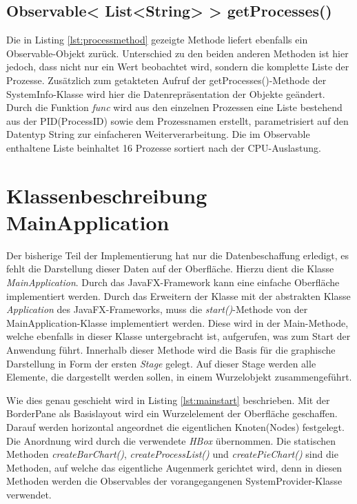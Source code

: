 \subsection{Observable< List<String> > getProcesses()}

Die in Listing \ref{lst:processmethod} gezeigte Methode liefert ebenfalls ein Observable-Objekt zurück. Unterschied zu den beiden anderen Methoden ist hier jedoch, dass nicht nur ein Wert beobachtet wird, sondern die komplette Liste der Prozesse. Zusätzlich zum getakteten Aufruf der getProcesses()-Methode der SystemInfo-Klasse wird hier die Datenrepräsentation der Objekte geändert. Durch die Funktion \textit{func} wird aus den einzelnen Prozessen eine Liste bestehend aus der PID(ProcessID) sowie dem Prozessnamen erstellt, parametrisiert auf den Datentyp String zur einfacheren Weiterverarbeitung. Die im Observable enthaltene Liste beinhaltet 16 Prozesse sortiert nach der CPU-Auslastung. \newpage
\section{Klassenbeschreibung MainApplication}
Der bisherige Teil der Implementierung hat nur die Datenbeschaffung erledigt, es fehlt die Darstellung dieser Daten auf der Oberfläche. Hierzu dient die Klasse \textit{MainApplication}. Durch das JavaFX-Framework kann eine einfache Oberfläche implementiert werden. Durch das Erweitern der Klasse mit der abstrakten Klasse \textit{Application} des JavaFX-Frameworks, muss die \textit{start()}-Methode von der MainApplication-Klasse implementiert werden. Diese wird in der Main-Methode, welche ebenfalls in dieser Klasse untergebracht ist, aufgerufen, was zum Start der Anwendung führt. Innerhalb dieser Methode wird die Basis für die graphische Darstellung in Form der ersten \textit{Stage} gelegt. Auf dieser Stage werden alle Elemente, die dargestellt werden sollen, in einem Wurzelobjekt zusammengeführt. 
 
Wie dies genau geschieht wird in Listing \ref{lst:mainstart} beschrieben. Mit der BorderPane als Basislayout wird ein Wurzelelement der Oberfläche geschaffen. Darauf werden horizontal angeordnet die eigentlichen Knoten(Nodes) festgelegt. Die Anordnung wird durch die verwendete \textit{HBox} übernommen. Die statischen Methoden \textit{createBarChart()}, \textit{createProcessList()} und \textit{createPieChart()} sind die Methoden, auf welche das eigentliche Augenmerk gerichtet wird, denn in diesen Methoden werden die Observables der vorangegangenen SystemProvider-Klasse verwendet. 
